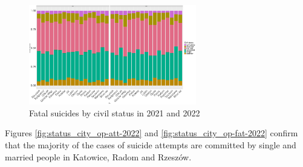 \documentclass{article}
\begin{document}
\begin{figure}[H]
    \centering
    \includegraphics[width=0.65\textwidth]{imgs/status_city_fat_suicides-2122.pdf}
    \caption{Fatal suicides by civil status  in 2021 and 2022}
    \label{fig:status_city_fat_suicides-2122}
\end{figure}
%
%
Figures \ref{fig:status_city_op-att-2022} and \ref{fig:status_city_op-fat-2022}
confirm that the majority of the cases of suicide attempts are committed
by single and married people in Katowice, Radom and Rzeszów.
\end{document}
